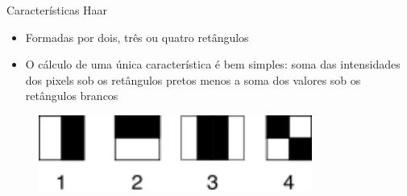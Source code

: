 \begin{frame}{Características Haar}
\begin{itemize}
    \item Formadas por dois, três ou quatro retângulos
    \item O cálculo de uma única característica é bem simples: soma das intensidades dos pixels sob os retângulos pretos menos a soma dos valores sob os retângulos brancos
\end{itemize}

\begin{figure}
    \centering
    \includegraphics[width=0.8\textwidth]{imagens/haar_like_features.png}
\end{figure}
\end{frame}

